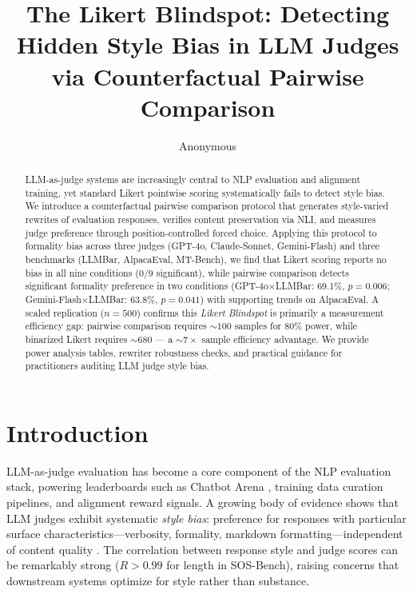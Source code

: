 \documentclass[11pt,a4paper]{article}
\title{The Likert Blindspot: Detecting Hidden Style Bias in LLM Judges\\via Counterfactual Pairwise Comparison}
\author{Anonymous}
\date{}
\begin{document}
\maketitle

\begin{abstract}
LLM-as-judge systems are increasingly central to NLP evaluation and alignment training, yet standard Likert pointwise scoring systematically fails to detect style bias.
We introduce a counterfactual pairwise comparison protocol that generates style-varied rewrites of evaluation responses, verifies content preservation via NLI, and measures judge preference through position-controlled forced choice.
Applying this protocol to formality bias across three judges (GPT-4o, Claude-Sonnet, Gemini-Flash) and three benchmarks (LLMBar, AlpacaEval, MT-Bench), we find that Likert scoring reports no bias in all nine conditions (0/9 significant), while pairwise comparison detects significant formality preference in two conditions (GPT-4o$\times$LLMBar: 69.1\%, $p{=}0.006$; Gemini-Flash$\times$LLMBar: 63.8\%, $p{=}0.041$) with supporting trends on AlpacaEval.
A scaled replication ($n{=}500$) confirms this \textit{Likert Blindspot} is primarily a measurement efficiency gap: pairwise comparison requires ${\sim}100$ samples for 80\% power, while binarized Likert requires ${\sim}680$ --- a ${\sim}7\times$ sample efficiency advantage.
We provide power analysis tables, rewriter robustness checks, and practical guidance for practitioners auditing LLM judge style bias.
\end{abstract}

\section{Introduction}
\label{sec:intro}

LLM-as-judge evaluation has become a core component of the NLP evaluation stack, powering leaderboards such as Chatbot Arena \cite{zheng2023judging}, training data curation pipelines, and alignment reward signals.
A growing body of evidence shows that LLM judges exhibit systematic \emph{style bias}: preference for responses with particular surface characteristics---verbosity, formality, markdown formatting---independent of content quality \cite{sosbench2025,casse2026,soumik2026}.
The correlation between response style and judge scores can be remarkably strong ($R{>}0.99$ for length in SOS-Bench), raising concerns that downstream systems optimize for style rather than substance.
\end{document}
